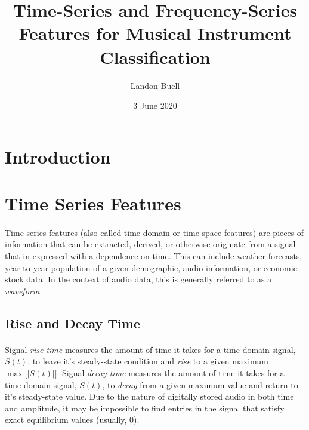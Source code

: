 \documentclass[12pt,letterpaper]{article}
\begin{document}

\title{Time-Series and Frequency-Series Features for Musical Instrument Classification}
\date{3 June 2020}
\author{Landon Buell}
\maketitle


\section{Introduction}



\section{Time Series Features}

\paragraph*{}Time series features (also called time-domain or time-space features) are pieces of information that can be extracted, derived, or otherwise originate from a signal that in expressed with a dependence on time. This can include weather forecasts, year-to-year population of a given demographic, audio information, or economic stock data. In the context of audio data, this is generally referred to as a \textit{waveform}




\subsection{Rise and Decay Time}

\paragraph*{}Signal \textit{rise time} measures the amount of time it takes for a time-domain signal, $S(t)$, to leave it's steady-state condition and \textit{rise} to a given maximum $\max\big[|S(t)|\big]$. Signal \textit{decay time} measures the amount of time it takes for a time-domain signal, $S(t)$, to \textit{decay} from a given maximum value and return to it's steady-state value. Due to the nature of digitally stored audio in both time and amplitude, it may be impossible to find entries in the signal that satisfy exact equilibrium values (usually, $0$).
\end{document}
